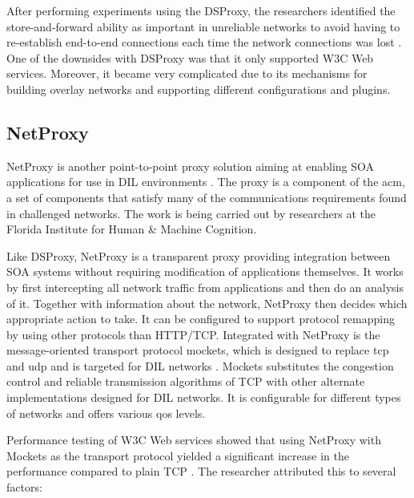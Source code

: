 After performing experiments using the DSProxy, the researchers identified the
store-and-forward ability as important in unreliable networks to avoid having to
re-establish end-to-end connections each time the network connections was lost
\cite{dsproxy-ffi}. One of the downsides with DSProxy was that it only supported
W3C Web services. Moreover, it became very complicated due to its mechanisms for
building overlay networks and supporting different configurations and plugins.

\subsection{NetProxy}

NetProxy is another point-to-point proxy solution aiming at enabling SOA
applications for use in DIL environments \cite{suri-netproxy}. The proxy is a
component of the \gls{acm}, a set of components that satisfy many of the
communications requirements found in challenged networks. The work is being
carried out by researchers at the Florida Institute for Human \& Machine
Cognition.

Like DSProxy, NetProxy is a transparent proxy providing integration between SOA
systems without requiring modification of applications themselves. It works by
first intercepting all network traffic from applications and then do an analysis
of it. Together with information about the network, NetProxy then decides which
appropriate action to take. It can be configured to support protocol remapping
by using other protocols than HTTP/TCP. Integrated with NetProxy is the
message-oriented transport protocol \gls{mockets}, which is designed to replace
\gls{tcp} and \gls{udp} and is targeted for DIL networks \cite{suri-netproxy}.
Mockets substitutes the congestion control and reliable transmission algorithms
of TCP with other alternate implementations designed for DIL networks. It is
configurable for different types of networks and offers various \gls{qos}
levels.

Performance testing of W3C Web services showed that using NetProxy with Mockets as
the transport protocol yielded a significant increase in the performance
compared to plain TCP \cite{suri-netproxy}. The researcher attributed this to
several factors:

